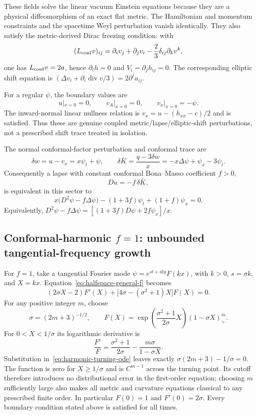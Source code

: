 These fields solve the linear vacuum Einstein equations because they are a
physical diffeomorphism of an exact flat metric.  The Hamiltonian and momentum
constraints and the spacetime Weyl perturbation vanish identically.  They also
satisfy the metric-derived Dirac freezing condition: with
\[
 (L_{\rm conf}v)_{ij}=\partial_i v_j+\partial_j v_i
 -\frac23\delta_{ij}\partial_kv^k,
\]
one has $L_{\rm conf}v=2a$, hence $\partial_t h=0$ and
$V_i=\partial_jh_{ij}=0$.  The corresponding elliptic shift equation is
$(\Delta v_i+\partial_i\operatorname{div}v/3)=2\partial^ja_{ij}$.

For a regular $\psi$, the boundary values are
\[
 u|_{x=0}=0,\qquad v_A|_{x=0}=0,\qquad v_x|_{x=0}=-\psi.
\]
The inward-normal linear nullness relation is
$v_x=u-(h_{xx}-c)/2$ and is satisfied.  Thus these are genuine coupled
metric/lapse/elliptic-shift perturbations, not a prescribed shift trace treated
in isolation.

The normal conformal-factor perturbation and conformal trace are
\[
 \delta w=u-v_x=x\psi_t+\psi,\qquad
 \delta\bar K_{\hat{}}=\frac{q-3\delta w}{x}
 =-x\Delta\psi+\psi_x-3\psi_t.
\]
Consequently a lapse with constant conformal Bona--Masso coefficient $f>0$,
\[
 Du=-f\,\delta\bar K_{\hat{}},
\]
is equivalent in this sector to
\begin{equation}
 x\big(D^2\psi-f\Delta\psi\big)
 -(1+3f)\psi_t+(1+f)\psi_x=0.
 \label{eq:halfspace-general-f}
\end{equation}
Equivalently,
$D^2\psi-f\Delta\psi=[(1+3f)D\psi+2f\psi_x]/x$.

\subsection{Conformal-harmonic $f=1$: unbounded tangential-frequency growth}

For $f=1$, take a tangential Fourier mode
$\psi=e^{st+iky}F(kx)$, with $k>0$, $s=\sigma k$, and $X=kx$.
Equation~\eqref{eq:halfspace-general-f} becomes
\begin{equation}
 (2\sigma X-2)F'(X)
 +\big[4\sigma-(\sigma^2+1)X\big]F(X)=0.
 \label{eq:harmonic-turning-ode}
\end{equation}
For any positive integer $m$, choose
\[
 \sigma=(2m+3)^{-1/2},\qquad
 F(X)=\exp\!\left(\frac{\sigma^2+1}{2\sigma}X\right)
 (1-\sigma X)_+^m.
\]
For $0<X<1/\sigma$ its logarithmic derivative is
\[
 \frac{F'}F=\frac{\sigma^2+1}{2\sigma}
 -\frac{m\sigma}{1-\sigma X}.
\]
Substitution in~\eqref{eq:harmonic-turning-ode} leaves exactly
$\sigma(2m+3)-1/\sigma=0$.  The function is zero for
$X\geq1/\sigma$ and is $C^{m-1}$ across the turning point.  Its cutoff
therefore introduces no distributional error in the first-order equation;
choosing $m$ sufficiently large also makes all metric and curvature equations
classical to any prescribed finite order.  In particular $F(0)=1$ and
$F'(0)=2\sigma$.  Every boundary condition stated above is satisfied for all
times.

